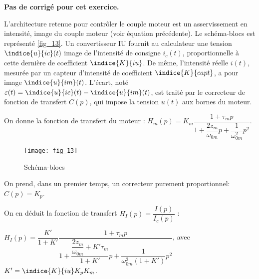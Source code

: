\normaltrue \difficilefalse \tdifficilefalse
\correctionfalse

\setcounter{numques}{0}


\ifcorrection
\else
\textbf{Pas de corrigé pour cet exercice.}
\fi


L’architecture retenue pour contrôler le couple moteur est un asservissement en intensité, image du
couple moteur (voir équation précédente). Le schéma-blocs est représenté \autoref{fig_13}. Un convertisseur IU
fournit au calculateur une tension $\indice{u}{ic}(t)$ image de l’intensité de consigne $i_c(t)$, proportionnelle à cette
dernière de coefficient $\indice{K}{iu}$. De même, l’intensité réelle $i(t)$, mesurée par un capteur d’intensité de
coefficient $\indice{K}{capt}$, a pour image $\indice{u}{im}(t)$. L’écart, noté $\varepsilon(t) = \indice{u}{ic}(t) - \indice{u}{im}(t)$, est traité par le correcteur de fonction de transfert $C(p)$, qui impose la tension $u(t)$ aux bornes du moteur.

On donne la fonction de transfert du moteur : $H_m(p)=K_m\dfrac{1+\tau_m p}{1+\dfrac{2z_m}{\omega_{0m}}p+\dfrac{1}{\omega_{0m}^2}p^2}$.


\begin{figure}[H]
\centering
\texttt{[image: fig\_13]}
\caption{Schéma-blocs \label{fig_13}}
\end{figure}


On prend, dans un premier temps, un correcteur purement proportionnel: $C(p)=K_p$.

On en déduit la fonction de transfert $H_I(p)=\dfrac{I(p)}{I_c(p)}$ :

$H_I(p)=\dfrac{K'}{1+K'}\dfrac{1+\tau_m p}{1+  
\dfrac{\dfrac{2z_m}{\omega_{0m}}+ K'\tau_m}{1+K'}p 
+ \dfrac{1}{\omega_{0m}^2(1+K')} p^2}$, avec $K'=\indice{K}{iu}K_pK_m$.



